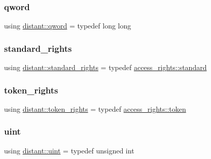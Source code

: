 \mbox{\label{namespacedistant_ac5f83107c559f04950d4c9fa5464364e}} 
\subsubsection{\texorpdfstring{qword}{qword}}
{\footnotesize\ttfamily using \mbox{\hyperlink{namespacedistant_ac5f83107c559f04950d4c9fa5464364e}{distant\+::qword}} = typedef long long}

\mbox{\label{namespacedistant_a8271b0fb08b7c0b4f0e1420ef3734393}} 
\subsubsection{\texorpdfstring{standard\+\_\+rights}{standard\_rights}}
{\footnotesize\ttfamily using \mbox{\hyperlink{structdistant_1_1access__rights_a1aa121d7e246b51f7386f992adce1664}{distant\+::standard\+\_\+rights}} = typedef \mbox{\hyperlink{structdistant_1_1access__rights_a1aa121d7e246b51f7386f992adce1664}{access\+\_\+rights\+::standard}}}

\mbox{\label{namespacedistant_a095c3f8e5fe6b6f524c18b63e4ba7aaa}} 
\subsubsection{\texorpdfstring{token\+\_\+rights}{token\_rights}}
{\footnotesize\ttfamily using \mbox{\hyperlink{structdistant_1_1access__rights_a6b4d9e837868c8c15cf407e4c80d7f3c}{distant\+::token\+\_\+rights}} = typedef \mbox{\hyperlink{structdistant_1_1access__rights_a6b4d9e837868c8c15cf407e4c80d7f3c}{access\+\_\+rights\+::token}}}

\mbox{\label{namespacedistant_af3c2023269e188e3cb45f57d6e2a2b8b}} 
\subsubsection{\texorpdfstring{uint}{uint}}
{\footnotesize\ttfamily using \mbox{\hyperlink{namespacedistant_af3c2023269e188e3cb45f57d6e2a2b8b}{distant\+::uint}} = typedef unsigned int}

